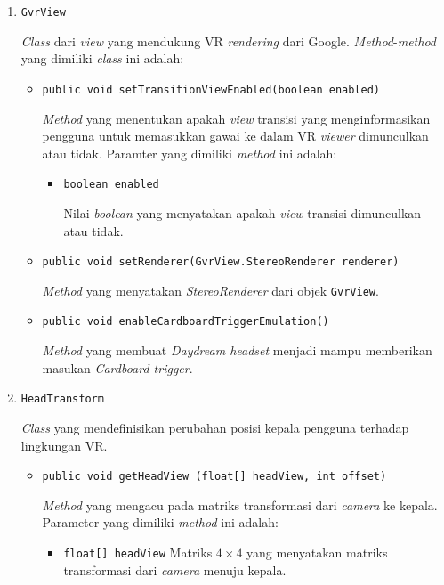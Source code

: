 \begin{enumerate}
		\item \texttt{GvrView}
		
		\textit{Class} dari \textit{view} yang mendukung VR \textit{rendering} dari Google. \textit{Method}-\textit{method} yang dimiliki \textit{class} ini adalah:
		
		\begin{itemize}			
			\item \texttt{public void  setTransitionViewEnabled(boolean enabled)}
			
			\textit{Method} yang menentukan apakah \textit{view} transisi yang menginformasikan pengguna untuk memasukkan gawai ke dalam VR \textit{viewer} dimunculkan atau tidak. Paramter yang dimiliki \textit{method} ini adalah:
			
			\begin{itemize}
				\item \texttt{boolean enabled}
				
				Nilai \textit{boolean} yang menyatakan apakah \textit{view} transisi dimunculkan atau tidak. 
			\end{itemize}
			
			\item \texttt{public void setRenderer(GvrView.StereoRenderer renderer)}
			
			\textit{Method} yang menyatakan \textit{StereoRenderer} dari objek \texttt{GvrView}.
			
			\item \texttt{public void enableCardboardTriggerEmulation()}
			
			\textit{Method} yang membuat \textit{Daydream headset} menjadi mampu memberikan masukan \textit{Cardboard trigger}.
			
		\end{itemize}
			
		\item \texttt{HeadTransform}
		
		\textit{Class} yang mendefinisikan perubahan posisi kepala pengguna terhadap lingkungan VR.
		
		\begin{itemize}
			\item \texttt{public void getHeadView (float[] headView, int offset)}
			
			\textit{Method} yang mengacu pada matriks transformasi dari \textit{camera} ke kepala. Parameter yang dimiliki \textit{method} ini adalah:			
			
			\begin{itemize}
				\item \texttt{float[] headView}
				Matriks $4\times4$ yang menyatakan matriks transformasi dari \textit{camera} menuju kepala. 
				

\end{itemize}
\end{itemize}
\end{enumerate}
